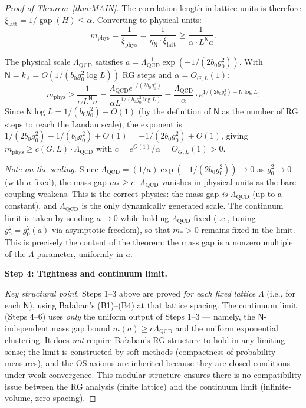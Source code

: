 \documentclass[11pt,a4paper]{article}
\theoremstyle{plain}
\theoremstyle{definition}
\theoremstyle{remark}
\DeclareMathOperator{\gap}{gap}
\begin{document}
\begin{proof}[Proof of Theorem~\ref{thm:MAIN}]
The correlation length in lattice units is therefore
$\xi_{\mathrm{latt}} = 1/\gap(H) \le \alpha$.
Converting to physical units:
\begin{equation}
  m_{\mathrm{phys}} = \frac{1}{\xi_{\mathrm{phys}}}
  = \frac{1}{\eta_{\mathsf{N}} \cdot \xi_{\mathrm{latt}}}
  \ge \frac{1}{\alpha \cdot L^{\mathsf{N}} a}.
\end{equation}

The physical scale $\Lambda_{\mathrm{QCD}}$ satisfies
$a = \Lambda_{\mathrm{QCD}}^{-1}
\exp(-1/(2b_0 g_0^2))$. With $\mathsf{N} = k_\Lambda = O(1/(b_0 g_0^2
\log L))$ RG steps and $\alpha = O_{G,L}(1)$:
\begin{equation}
  m_{\mathrm{phys}} \ge \frac{1}{\alpha L^{\mathsf{N}} a}
  = \frac{\Lambda_{\mathrm{QCD}} e^{1/(2b_0 g_0^2)}}
  {\alpha L^{1/(b_0 g_0^2 \log L)}}
  = \frac{\Lambda_{\mathrm{QCD}}}{\alpha}
  \cdot e^{1/(2b_0 g_0^2) - \mathsf{N}\log L}.
\end{equation}
Since $\mathsf{N}\log L = 1/(b_0 g_0^2) + O(1)$ (by the
definition of $\mathsf{N}$ as the number of RG steps to reach
the Landau scale), the exponent is
$1/(2b_0 g_0^2) - 1/(b_0 g_0^2) + O(1) = -1/(2b_0 g_0^2) + O(1)$,
giving $m_{\mathrm{phys}} \ge c(G,L)\cdot\Lambda_{\mathrm{QCD}}$
with $c = e^{O(1)}/\alpha = O_{G,L}(1) > 0$.

\emph{Note on the scaling.} Since
$\Lambda_{\mathrm{QCD}} = (1/a)\exp(-1/(2b_0 g_0^2))
\to 0$ as $g_0^2 \to 0$ (with $a$ fixed), the mass gap
$m_* \ge c \cdot \Lambda_{\mathrm{QCD}}$ vanishes in
physical units as the bare coupling weakens. This is
the correct physics: the mass gap \emph{is}
$\Lambda_{\mathrm{QCD}}$ (up to a constant), and
$\Lambda_{\mathrm{QCD}}$ is the only dynamically
generated scale. The continuum limit is taken by
sending $a \to 0$ while holding $\Lambda_{\mathrm{QCD}}$
fixed (i.e., tuning $g_0^2 = g_0^2(a)$ via asymptotic
freedom), so that $m_* > 0$ remains fixed in the limit.
This is precisely the content of the
theorem: the mass gap is a nonzero multiple of the
$\Lambda$-parameter, uniformly in $a$.

\medskip\noindent
\textbf{Step 4: Tightness and continuum limit.}

\emph{Key structural point.} Steps 1--3 above are
proved \emph{for each fixed lattice} $\Lambda$ (i.e., for
each $\mathsf{N}$), using Ba{\l}aban's (B1)--(B4) at that
lattice spacing. The continuum limit (Steps 4--6) uses
\emph{only} the uniform output of Steps 1--3 --- namely,
the $\mathsf{N}$-independent mass gap bound
$m(a) \ge c\Lambda_{\mathrm{QCD}}$ and the uniform
exponential clustering. It does \emph{not} require
Ba{\l}aban's RG structure to hold in any limiting sense;
the limit is constructed by soft methods (compactness of
probability measures), and the OS axioms are inherited
because they are closed conditions under weak convergence.
This modular structure ensures there is no compatibility
issue between the RG analysis (finite lattice) and the
continuum limit (infinite-volume, zero-spacing).


\end{proof}
\end{document}
